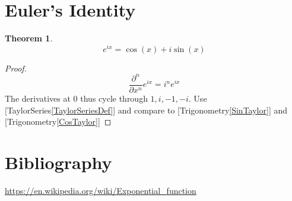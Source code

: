 \documentclass[]{article}
\newcommand{\pqty}[1]{{\left(#1\right)}}
\newcommand{\pdiff}[2]{\frac{\partial^{#2}}{\partial #1^{#2}}}
\newtheorem{theorem}{Theorem}[section]
\numberwithin{equation}{section}
\begin{document}
	\section{Euler's Identity}
	\begin{theorem}
		\begin{equation}
		e^{ix}=\cos\pqty{x}+i\sin\pqty{x}
		\end{equation}
	\end{theorem}
	\begin{proof}
		\begin{equation}
			\pdiff{x}{n}e^{ix}=i^ne^{ix}
		\end{equation}
		The derivatives at 0 thus cycle through \(1,i,-1,-i\). Use [TaylorSeries\eqref{TaylorSeriesDef}] and compare to [Trigonometry\eqref{SinTaylor}] and [Trigonometry\eqref{CosTaylor}]
	\end{proof}
	
	\section{Bibliography}
	\url{https://en.wikipedia.org/wiki/Exponential_function}
	
\end{document}
